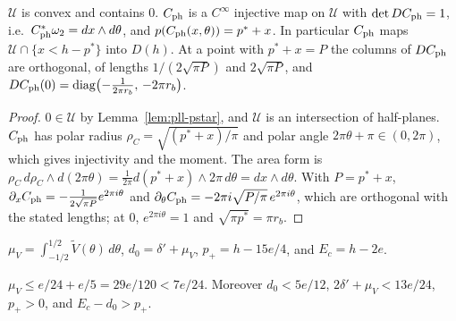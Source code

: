 \begin{lemma}\label{lem:pll-physical-chart}
$\mathcal U$ is convex and contains $0$. $C_{\rm ph}$ is a $C^\infty$ injective map on $\mathcal U$ with
$\det DC_{\rm ph}=1$, i.e.\ $C_{\rm ph}^*\omega_2=dx\wedge d\theta$, and $p(C_{\rm ph}(x,\theta))=p^*+x$. In particular
$C_{\rm ph}$ maps $\mathcal U\cap\{x<h-p^*\}$ into $D(h)$. At a point with $p^*+x=P$ the columns of $DC_{\rm ph}$ are
orthogonal, of lengths $1/(2\sqrt{\pi P})$ and $2\sqrt{\pi P}$, and
$DC_{\rm ph}(0)=\operatorname{diag}\bigl(-\frac1{2\pi r_b},\,-2\pi r_b\bigr)$.
\end{lemma}

\begin{proof}
$0\in\mathcal U$ by Lemma~\ref{lem:pll-pstar}, and $\mathcal U$ is an intersection of half-planes. $C_{\rm ph}$ has
polar radius $\rho_C=\sqrt{(p^*+x)/\pi}$ and polar angle $2\pi\theta+\pi\in(0,2\pi)$, which gives injectivity and the
moment. The area form is $\rho_C\,d\rho_C\wedge d(2\pi\theta)=\frac1{2\pi}d(p^*+x)\wedge2\pi\,d\theta=dx\wedge d\theta$.
With $P=p^*+x$, $\partial_xC_{\rm ph}=-\frac{1}{2\sqrt{\pi P}}e^{2\pi i\theta}$ and
$\partial_\theta C_{\rm ph}=-2\pi i\sqrt{P/\pi}\,e^{2\pi i\theta}$, which are orthogonal with the stated lengths; at $0$,
$e^{2\pi i\theta}=1$ and $\sqrt{\pi p^*}=\pi r_b$.
\end{proof}

\begin{definition}\label{def:pll-comparison-constants}
$\mu_V=\int_{-1/2}^{1/2}\tilde V(\theta)\,d\theta$, $d_0=\delta'+\mu_V$, $p_+=h-15e/4$, and $E_c=h-2e$.
\end{definition}

\begin{lemma}\label{lem:pll-mean}
$\mu_V\le e/24+e/5=29e/120<7e/24$. Moreover $d_0<5e/12$, $2\delta'+\mu_V<13e/24$, $p_+>0$, and $E_c-d_0>p_+$.
\end{lemma}

